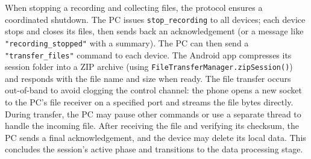 When stopping a recording and collecting files, the protocol ensures a coordinated shutdown. The PC issues \texttt{stop\_recording} to all devices; each device stops and closes its files, then sends back an acknowledgement (or a message like \texttt{"recording\_stopped"} with a summary). The PC can then send a \texttt{"transfer\_files"} command to each device. The Android app compresses its session folder into a ZIP archive (using \texttt{FileTransferManager.zipSession()}) and responds with the file name and size when ready. The file transfer occurs out-of-band to avoid clogging the control channel: the phone opens a new socket to the PC's file receiver on a specified port and streams the file bytes directly. During transfer, the PC may pause other commands or use a separate thread to handle the incoming file. After receiving the file and verifying its checksum, the PC sends a final acknowledgement, and the device may delete its local data. This concludes the session's active phase and transitions to the data processing stage.

